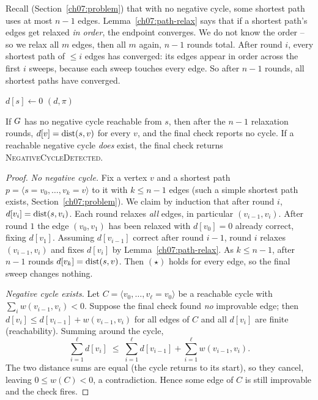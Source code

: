 \begin{intuitionbox}
Recall (Section~\ref{ch07:problem}) that with no negative cycle, some shortest path uses at
most $n-1$ edges. Lemma~\ref{ch07:path-relax} says that if a shortest path's edges get
relaxed \emph{in order}, the endpoint converges. We do not know the order -- so we relax all
$m$ edges, then all $m$ again, $n-1$ rounds total. After round $i$, every shortest path of
$\le i$ edges has converged: its edges appear in order across the first $i$ sweeps,
because each sweep touches every edge. So after $n-1$ rounds, all shortest paths have
converged.
\end{intuitionbox}

\begin{algorithm}[H]
\DontPrintSemicolon
\caption{\textsc{Bellman-Ford}$(\Gph,w,s)$ -- arbitrary weights}
 \quad $d[s]\gets 0$\;
\Return $(d,\pi)$\;
\end{algorithm}

\begin{theorem}
\label{ch07:bf-correct}
If $G$ has no negative cycle reachable from $s$, then after the $n-1$ relaxation rounds,
$d[v]=\operatorname{dist}(s,v)$ for every $v$, and the final check reports no cycle. If a reachable
negative cycle \emph{does} exist, the final check returns \textsc{NegativeCycleDetected}.
\end{theorem}

\begin{proof}
\emph{No negative cycle.} Fix a vertex $v$ and a shortest path
$p=\langle s=v_0,\dots,v_k=v\rangle$ to it with $k\le n-1$ edges
(such a simple shortest path exists, Section~\ref{ch07:problem}). We claim by induction that
after round $i$, $d[v_i]=\operatorname{dist}(s,v_i)$. Each round relaxes \emph{all} edges, in particular
$(v_{i-1},v_i)$. After round $1$ the edge $(v_0,v_1)$ has been relaxed with
$d[v_0]=0$ already correct, fixing $d[v_1]$. Assuming $d[v_{i-1}]$ correct after round
$i-1$, round $i$ relaxes $(v_{i-1},v_i)$ and fixes $d[v_i]$ by
Lemma~\ref{ch07:path-relax}. As $k\le n-1$, after $n-1$ rounds $d[v_k]=\operatorname{dist}(s,v)$. Then
$(\star)$ holds for every edge, so the final sweep changes nothing.

\emph{Negative cycle exists.} Let $C=\langle v_0,\dots,v_\ell=v_0\rangle$ be a reachable
cycle with $\sum_{i} w(v_{i-1},v_i)<0$. Suppose the final check found \emph{no} improvable
edge; then $d[v_i]\le d[v_{i-1}]+w(v_{i-1},v_i)$ for all edges of $C$ and all $d[v_i]$ are
finite (reachability). Summing around the cycle,
\[
   \sum_{i=1}^{\ell} d[v_i] \;\le\; \sum_{i=1}^{\ell} d[v_{i-1}] + \sum_{i=1}^{\ell}
   w(v_{i-1},v_i).
\]
The two distance sums are equal (the cycle returns to its start), so they cancel, leaving
$0\le w(C)<0$, a contradiction. Hence some edge of $C$ is still improvable and the check
fires.
\end{proof}

